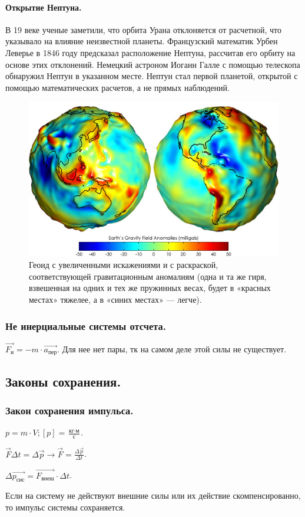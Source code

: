 \documentclass{article}
\begin{document}
	\paragraph{Открытие Нептуна.} В 19 веке ученые заметили, что орбита Урана отклоняется от расчетной, что указывало на влияние неизвестной планеты. Французский математик Урбен Леверье в 1846 году предсказал расположение Нептуна, рассчитав его орбиту на основе этих отклонений. Немецкий астроном Иоганн Галле с помощью телескопа обнаружил Нептун в указанном месте. Нептун стал первой планетой, открытой с помощью математических расчетов, а не прямых наблюдений.
	\begin{figure}[H]
		\includegraphics[height=0.25\textwidth]{extra-materials/Геоид}
		\caption{Геоид с увеличенными искажениями и с раскраской, соответствующей гравитационным аномалиям (одна и та же гиря, взвешенная на одних и тех же пружинных весах, будет в «красных местах» тяжелее, а в «синих местах» — легче).}
	\end{figure}
	\subsubsection{Не инерциальные системы отсчета.}
	\begin{definition}
		$\vec{F_{\text{и}}} = -m \cdot \vec{a_{\text{пер}}}$. Для нее нет пары, тк на самом деле этой силы не существует.
	\end{definition}
	\subsection{Законы сохранения.}
	\subsubsection{Закон сохранения импульса.}
	\begin{definition}[Импульс]
		$p = m \cdot V; [p] = \frac{\text{кг} \cdot \text{м}}{\text{с}}$.
	\end{definition}
	\begin{definition}
		$\vec{F} \varDelta t = \varDelta \vec{p} \rightarrow \vec{F} = \frac{\varDelta \vec{p}}{\varDelta t}$.
	\end{definition}
	\begin{definition}
		$\varDelta \vec{p_{\text{сис}}} = \vec{F_{\text{внеш}}} \cdot \varDelta t$.
	\end{definition}
	\begin{definition}
		Если на систему не действуют внешние силы или их действие скомпенсированно, то импульс системы сохраняется.
	\end{definition}
\end{document}

